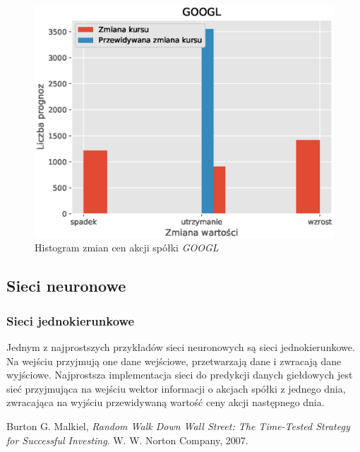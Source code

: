 \documentclass[a4paper, twoside, 11pt, openright]{article}
\begin{document}
\begin{figure}[H]
\centering \includegraphics[scale=0.9]{img/linear_regression/l_r_discrete_score}
\caption{Histogram zmian cen akcji spółki \textit{GOOGL}}
\label{l_r_discrete_score}
\end{figure}

\subsection{Sieci neuronowe}

\subsubsection{Sieci jednokierunkowe}

Jednym z najprostszych przykładów sieci neuronowych są sieci jednokierunkowe. Na wejściu przyjmują one dane wejściowe, przetwarzają dane i zwracają dane wyjściowe. Najprostsza implementacja sieci do predykcji danych giełdowych jest sieć przyjmująca na wejściu wektor informacji o akcjach spółki z jednego dnia, zwracająca na wyjściu przewidywaną wartość ceny akcji następnego dnia.



\newpage

\renewcommand{\refname}{Bibliografia}
\begin{thebibliography}{9}

  Burton G. Malkiel,
  \textit{Random Walk Down Wall Street: The Time-Tested Strategy for Successful Investing}.
  W. W. Norton Company,
  2007.

\end{thebibliography}
\end{document}

